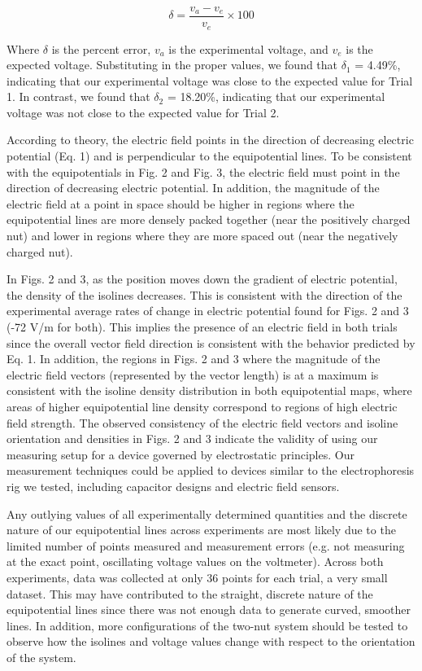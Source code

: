 \documentclass[conference]{IEEEtran}
\begin{document}
\begin{equation}
\delta = \frac{v_a - v_e}{v_e} \times 100
\end{equation}

Where $\delta$ is the percent error, $v_a$ is the experimental voltage, and $v_e$ is the expected voltage. Substituting in the proper values, we found that $\delta_1$ = 4.49\%, indicating that our experimental voltage was close to the expected value for Trial 1. In contrast, we found that $\delta_2$ = 18.20\%, indicating that our experimental voltage was not close to the expected value for Trial 2.

According to theory, the electric field points in the direction of decreasing electric potential (Eq. 1) and is perpendicular to the equipotential lines. %
To be consistent with the equipotentials in Fig. 2 and Fig. 3, the electric field must point in the direction of decreasing electric potential. In addition, the magnitude of the electric field at a point in space should be higher in regions where the equipotential lines are more densely packed together (near the positively charged nut) and lower in regions where they are more spaced out (near the negatively charged nut).

In Figs. 2 and 3, as the position moves down the gradient of electric potential, the density of the isolines decreases. This is consistent with the direction of the experimental average rates of change in electric potential found for Figs. 2 and 3 (-72 V/m for both). This implies the presence of an electric field in both trials since the overall vector field direction is consistent with the behavior predicted by Eq. 1. In addition, the regions in Figs. 2 and 3 where the magnitude of the electric field vectors (represented by the vector length) is at a maximum is consistent with the isoline density distribution in both equipotential maps, where areas of higher equipotential line density correspond to regions of high electric field strength. The observed consistency of the electric field vectors and isoline orientation and densities in Figs. 2 and 3 indicate the validity of using our measuring setup for a device governed by electrostatic principles. Our measurement techniques could be applied to devices similar to the electrophoresis rig we tested, including capacitor designs and electric field sensors. 

Any outlying values of all experimentally determined quantities and the discrete nature of our equipotential lines across experiments are most likely due to the limited number of points measured and measurement errors (e.g. not measuring at the exact point, oscillating voltage values on the voltmeter). Across both experiments, data was collected at only 36 points for each trial, a very small dataset. This may have contributed to the straight, discrete nature of the equipotential lines since there was not enough data to generate curved, smoother lines. In addition, more configurations of the two-nut system should be tested to observe how the isolines and voltage values change with respect to the orientation of the system.
\end{document}
